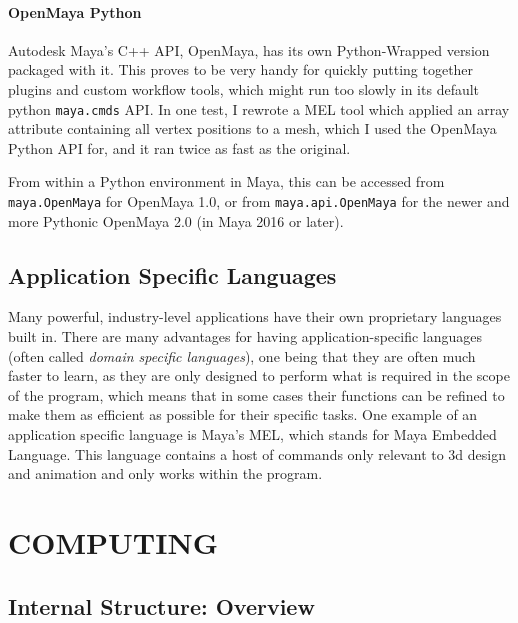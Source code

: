 \hypertarget{openmaya-python}{%
\paragraph{OpenMaya Python}\label{openmaya-python}}

Autodesk Maya's C++ API, OpenMaya, has its own Python-Wrapped version packaged with it. This proves to be very handy for quickly putting together plugins and custom workflow tools, which might run too slowly in its default python \texttt{maya.cmds} API. In one test, I rewrote a MEL tool which applied an array attribute containing all vertex positions to a mesh, which I used the OpenMaya Python API for, and it ran twice as fast as the original.

From within a Python environment in Maya, this can be accessed from \texttt{maya.OpenMaya} for OpenMaya 1.0, or from \texttt{maya.api.OpenMaya} for the newer and more Pythonic OpenMaya 2.0 (in Maya 2016 or later).

\hypertarget{application-specific-languages}{%
\subsection{Application Specific Languages}\label{application-specific-languages}}

Many powerful, industry-level applications have their own proprietary languages built in. There are many advantages for having application-specific languages (often called \emph{domain specific languages}), one being that they are often much faster to learn, as they are only designed to perform what is required in the scope of the program, which means that in some cases their functions can be refined to make them as efficient as possible for their specific tasks. One example of an application specific language is Maya's MEL, which stands for Maya Embedded Language. This language contains a host of commands only relevant to 3d design and animation and only works within the program.

\pagebreak\hypertarget{computing}{%
\section{COMPUTING}\label{computing}}

\hypertarget{internal-structure-overview}{%
\subsection{Internal Structure: Overview}\label{internal-structure-overview}}

